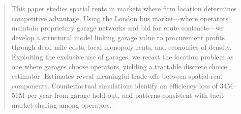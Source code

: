 \documentclass[12pt]{article}
\begin{document}
	\maketitle
	\begin{abstract}
		
		This paper studies spatial rents in markets where firm location determines 
competitive advantage. Using the London bus market---where operators maintain 
proprietary garage networks and bid for route contracts---we develop a 
structural model linking garage value to procurement profits through dead mile 
costs, local monopoly rents, and economies of density. Exploiting the exclusive 
use of garages, we recast the location problem as one where garages choose 
operators, yielding a tractable discrete choice estimator. Estimates reveal 
meaningful trade-offs between spatial rent components. Counterfactual 
simulations identify an efficiency loss of \textsterling 34M--\textsterling 
51M per year from garage hold-out, and patterns consistent with tacit 
market-sharing among operators.
		

\end{abstract}
\end{document}
